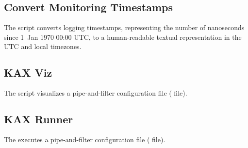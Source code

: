 		\subsection{Convert Monitoring Timestamps}
		
			The script  converts \KiekerMonitoringPart{} logging timestamps, representing the number of nanoseconds since 1~Jan 1970 00:00 UTC, to a human-readable textual representation in the UTC and local timezones.\\
		
		\subsection{KAX Viz}
		
			The  script visualizes a \KiekerAnalysisPart{} pipe-and-filter configuration file ( file).
		
		\subsection{KAX Runner}
		
		The  executes a \KiekerAnalysisPart{} pipe-and-filter configuration file ( file).
			
	